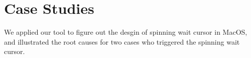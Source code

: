 \section{Case Studies} \label{sec:casestudy}
We applied our tool to figure out the desgin of spinning wait cursor in MacOS,
and illustrated the root causes for two cases who triggered the spinning wait cursor.




%

